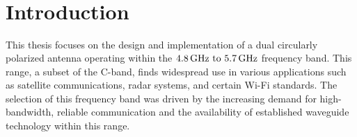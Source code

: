 \documentclass[11pt,a4paper,twoside,openany]{report}
\begin{document}

\begin{titlepage}
    
\end{titlepage}

\newpage\ \newpage






\newpage\ \newpage



\newpage\ \newpage



\newpage\ \newpage


\tableofcontents

\listoffigures

\chapter*{Introduction}
\label{chapter:introduction}

This thesis focuses on the design and implementation of a dual circularly polarized antenna operating within the $\frequencyrange$ frequency band. This range, a subset of the C-band, finds widespread use in various applications such as satellite communications, radar systems, and certain Wi-Fi standards. The selection of this frequency band was driven by the increasing demand for high-bandwidth, reliable communication and the availability of established waveguide technology within this range.
\end{document}
